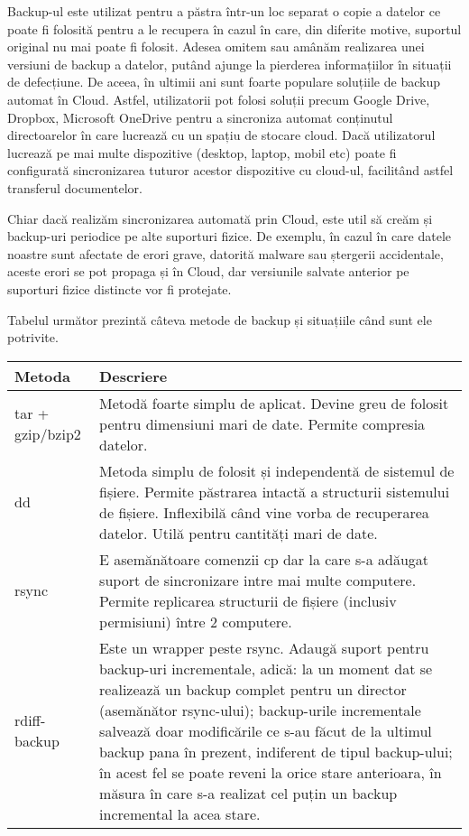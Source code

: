 Backup-ul este utilizat pentru a păstra într-un loc separat o copie a datelor ce
poate fi folosită pentru a le recupera în cazul în care, din diferite motive,
suportul original nu mai poate fi folosit. Adesea omitem sau amânăm realizarea
unei versiuni de backup a datelor, putând ajunge la pierderea informațiilor în
situații de defecțiune. De aceea, în ultimii ani sunt foarte populare soluțiile
de backup automat în Cloud. Astfel, utilizatorii pot folosi soluții precum
Google Drive, Dropbox, Microsoft OneDrive pentru a sincroniza automat conținutul
directoarelor în care lucrează cu un spațiu de stocare cloud. Dacă utilizatorul
lucrează pe mai multe dispozitive (desktop, laptop, mobil etc) poate fi
configurată sincronizarea tuturor acestor dispozitive cu cloud-ul, facilitând
astfel transferul documentelor.

Chiar dacă realizăm sincronizarea automată prin Cloud, este util să creăm și
backup-uri periodice pe alte suporturi fizice. De exemplu, în cazul în care
datele noastre sunt afectate de erori grave, datorită malware sau ștergerii
accidentale, aceste erori se pot propaga și în Cloud, dar versiunile salvate
anterior pe suporturi fizice distincte vor fi protejate.

Tabelul următor prezintă câteva metode de backup și situațiile când sunt ele
potrivite.

\begin{table}[htb]
\begin{center}
	\begin{tabular}{ | p{} | p{} | }
	\hline
		\textbf{Metoda} & \textbf{Descriere} \\
	\hline
		tar + gzip/bzip2 & Metodă foarte simplu de aplicat. Devine greu
		de folosit pentru dimensiuni mari de date. Permite compresia
		datelor. \\
	\hline
		dd & Metoda simplu de folosit și independentă de sistemul de
		fișiere. Permite păstrarea intactă a structurii sistemului de
		fișiere. Inflexibilă când vine vorba de recuperarea datelor.
		Utilă pentru cantități mari de date. \\
	\hline
		rsync & E asemănătoare comenzii cp dar la care s-a adăugat
		suport de sincronizare intre mai multe computere. Permite
		replicarea structurii de fișiere (inclusiv permisiuni) între 2
		computere. \\
	\hline
		rdiff-backup & Este un wrapper peste rsync. Adaugă suport pentru
		backup-uri incrementale, adică: la un moment dat se realizează
		un backup complet pentru un director (asemănător rsync-ului);
		backup-urile incrementale salvează doar modificările ce s-au
		făcut de la ultimul backup pana în prezent, indiferent de tipul
		backup-ului; în acest fel se poate reveni la orice stare
		anterioara, în măsura în care s-a realizat cel puțin un backup
		incremental la acea stare. \\
	\hline
	\end{tabular}
	\label{table:metode-backup}
\end{center}
\end{table}

